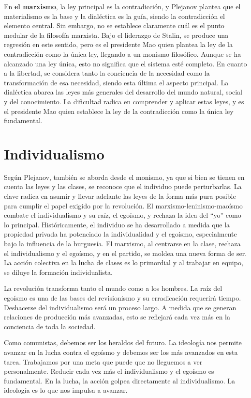 \documentclass[
  jou,
  floatsintext,
  longtable,
  a4paper,
  nolmodern,
  notxfonts,
  notimes,
  12pt,
  colorlinks=true,linkcolor=blue,citecolor=blue,urlcolor=blue]{apa7}
\begin{document}
En \textbf{el marxismo}, la ley principal es la contradicción, y
Plejanov plantea que el materialismo es la base y la dialéctica es la
guía, siendo la contradicción el elemento central. Sin embargo, no se
establece claramente cuál es el punto medular de la filosofía marxista.
Bajo el liderazgo de Stalin, se produce una regresión en este sentido,
pero es el presidente Mao quien plantea la ley de la contradicción como
la única ley, llegando a un monismo filosófico. Aunque se ha alcanzado
una ley única, esto no significa que el sistema esté completo. En cuanto
a la libertad, se considera tanto la conciencia de la necesidad como la
transformación de esa necesidad, siendo esta última el aspecto
principal. La dialéctica abarca las leyes más generales del desarrollo
del mundo natural, social y del conocimiento. La dificultad radica en
comprender y aplicar estas leyes, y es el presidente Mao quien establece
la ley de la contradicción como la única ley fundamental.

\section{Individualismo}\label{individualismo}

Según Plejanov, también se aborda desde el monismo, ya que si bien se
tienen en cuenta las leyes y las clases, se reconoce que el individuo
puede perturbarlas. La clave radica en asumir y llevar adelante las
leyes de la forma más pura posible para cumplir el papel exigido por la
revolución. El marxismo-leninismo-maoísmo combate el individualismo y su
raíz, el egoísmo, y rechaza la idea del ``yo'' como lo principal.
Históricamente, el individuo se ha desarrollado a medida que la
propiedad privada ha potenciado la individualidad y el egoísmo,
especialmente bajo la influencia de la burguesía. El marxismo, al
centrarse en la clase, rechaza el individualismo y el egoísmo, y en el
partido, se moldea una nueva forma de ser. La acción colectiva en la
lucha de clases es lo primordial y al trabajar en equipo, se diluye la
formación individualista.

La revolución transforma tanto el mundo como a los hombres. La raíz del
egoísmo es una de las bases del revisionismo y su erradicación requerirá
tiempo. Deshacerse del individualismo será un proceso largo. A medida
que se generan relaciones de producción más avanzadas, esto se reflejará
cada vez más en la conciencia de toda la sociedad.

Como comunistas, debemos ser los heraldos del futuro. La ideología nos
permite avanzar en la lucha contra el egoísmo y debemos ser los más
avanzados en esta tarea. Trabajamos por una meta que puede que no
lleguemos a ver personalmente. Reducir cada vez más el individualismo y
el egoísmo es fundamental. En la lucha, la acción golpea directamente al
individualismo. La ideología es lo que nos impulsa a avanzar.
\end{document}
